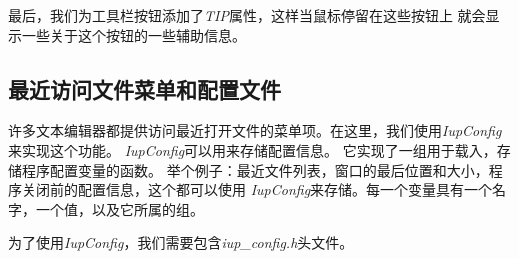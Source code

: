 \documentclass{ctexart}
\begin{document}
最后，我们为工具栏按钮添加了\emph{TIP}属性，这样当鼠标停留在这些按钮上
就会显示一些关于这个按钮的一些辅助信息。

\subsection{最近访问文件菜单和配置文件}

许多文本编辑器都提供访问最近打开文件的菜单项。在这里，我们使用\emph{IupConfig}
来实现这个功能。
\emph{IupConfig}可以用来存储配置信息。
它实现了一组用于载入，存储程序配置变量的函数。
举个例子：最近文件列表，窗口的最后位置和大小，程序关闭前的配置信息，这个都可以使用
\emph{IupConfig}来存储。每一个变量具有一个名字，一个值，以及它所属的组。

为了使用\emph{IupConfig}，我们需要包含\emph{iup\_config.h}头文件。
\end{document}
